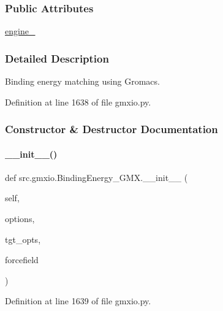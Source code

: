 \subsubsection*{Public Attributes}
\begin{DoxyCompactItemize}
\item 
\hyperlink{classsrc_1_1gmxio_1_1BindingEnergy__GMX_a4c1f6291f6cc9cb0fa0e1d74d238d974}{engine\+\_\+}
\end{DoxyCompactItemize}


\subsubsection{Detailed Description}
Binding energy matching using Gromacs. 



Definition at line 1638 of file gmxio.\+py.



\subsubsection{Constructor \& Destructor Documentation}
\mbox{\label{classsrc_1_1gmxio_1_1BindingEnergy__GMX_aa83b6a721eff58cbee1c1067e13ea297}} 
\paragraph{\texorpdfstring{\+\_\+\+\_\+init\+\_\+\+\_\+()}{\_\_init\_\_()}}
{\footnotesize\ttfamily def src.\+gmxio.\+Binding\+Energy\+\_\+\+G\+M\+X.\+\_\+\+\_\+init\+\_\+\+\_\+ (\begin{DoxyParamCaption}\item[{}]{self,  }\item[{}]{options,  }\item[{}]{tgt\+\_\+opts,  }\item[{}]{forcefield }\end{DoxyParamCaption})}



Definition at line 1639 of file gmxio.\+py.



